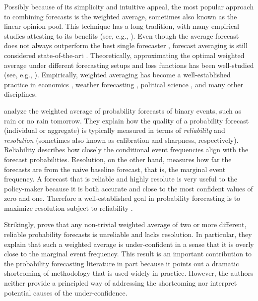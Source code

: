 \documentclass[11pt]{article}
\theoremstyle{definition}
\theoremstyle{definition}
\begin{document}
Possibly because of its simplicity and intuitive appeal, the most
popular approach to combining forecasts is the weighted average, sometimes also known as the linear opinion pool. 
This technique has a long tradition, with many empirical studies attesting to its benefits (see, e.g., \citealt{bates1969combination, clemen1989combining, armstrong2}). 
Even though the average forecast does not always outperform the best single forecaster \citep{hibon2005combine},
forecast averaging is still considered state-of-the-art \citep{elliott2013handbook}. Theoretically,  approximating the optimal weighted average under different forecasting setups and loss functions has been well-studied (see, e.g., \citealt{juditsky2008learning, degroot1991optimal}). Empirically, weighted averaging has become a well-established practice in economics \citep{blix2001good},  weather forecasting \citep{raftery2005using}, political science \citep{graefea2014combining}, and many other disciplines.
%


\cite{Ranjan08} analyze the weighted average of probability forecasts of binary events, such as rain or no
rain tomorrow. They explain how the quality of a probability forecast
(individual or aggregate) is typically measured in terms of
\textit{reliability} and \textit{resolution} (sometimes also known as calibration and
sharpness, respectively). Reliability describes how closely the
conditional event frequencies align with the forecast
probabilities. Resolution, on the other hand, measures how far the
forecasts are from the naive baseline forecast, that is, the marginal
event frequency. A forecast that is reliable and highly resolute is
very useful to the policy-maker because it is both accurate and close
to the most confident values of zero and one. Therefore a
well-established goal in probability forecasting is to maximize resolution subject to
reliability \citep{murphy1987general, gneiting2007probabilistic}.


Strikingly, \cite{Ranjan08} prove that any non-trivial weighted average
of two or more different, reliable probability forecasts is
unreliable and lacks resolution. In particular, they explain that such
a weighted average is  under-confident in a sense that it is overly
close to the marginal event frequency. This result is an important
contribution to the probability forecasting literature in part
because it points out a dramatic shortcoming of methodology that is
used widely in practice. However, the authors neither provide a
principled way of addressing the shortcoming nor interpret potential causes of the under-confidence. 
\end{document}
